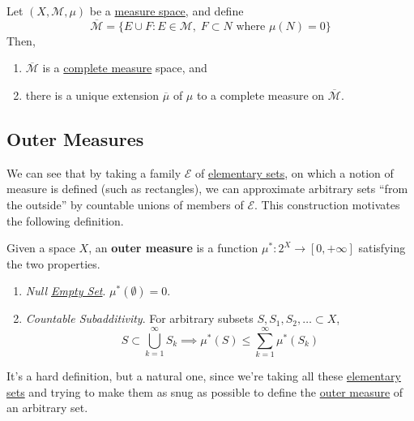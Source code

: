 	\begin{definition}
	  \label{def:completion-of-a-measure}
		Let $(X, \mathcal{M}, \mu)$ be a \hyperref[def:measure-space]{measure space}, and define 
		\begin{equation}
			\overline{\mathcal{M}} = \{E \cup F \colon E \in \mathcal{M}, \; F \subset N \text{ where } \mu(N) = 0\}
		\end{equation}
		Then, 
		\begin{enumerate}
			\item $\overline{\mathcal{M}}$ is a \hyperref[def:complete-measure]{complete measure} space, and 
			\item there is a unique extension $\overline{\mu}$ of $\mu$ to a complete measure on $\overline{\mathcal{M}}$. 
		\end{enumerate}
	\end{definition}

\subsection{Outer Measures}

	We can see that by taking a family $\mathcal{E}$ of \hyperref[def:elementary-set]{elementary sets}, on which a notion of measure is defined (such as rectangles), we can approximate arbitrary sets ``from the outside'' by countable unions of members of $\mathcal{E}$. This construction motivates the following definition. 

  \begin{definition}
    \label{def:outer-measure}
    Given a space $X$, an \textbf{outer measure} is a function $\mu^\ast : 2^X \to [0, +\infty]$ satisfying the two properties. 
    \begin{enumerate}
      \item \textit{Null \hyperref[st-def:empty-set]{Empty Set}}. $\mu^\ast(\emptyset) = 0$. 
      \item \textit{Countable Subadditivity}. For arbitrary subsets $S, S_1, S_2, \ldots \subset X$, 
      \begin{equation}
        S \subset \bigcup_{k=1}^\infty S_k \implies \mu^\ast (S) \leq \sum_{k=1}^\infty \mu^\ast (S_k)
      \end{equation} 
    \end{enumerate}
  \end{definition}

  It's a hard definition, but a natural one, since we're taking all these \hyperref[def:elementary-set]{elementary sets} and trying to make them as snug as possible to define the \hyperref[def:outer-measure]{outer measure} of an arbitrary set. 

